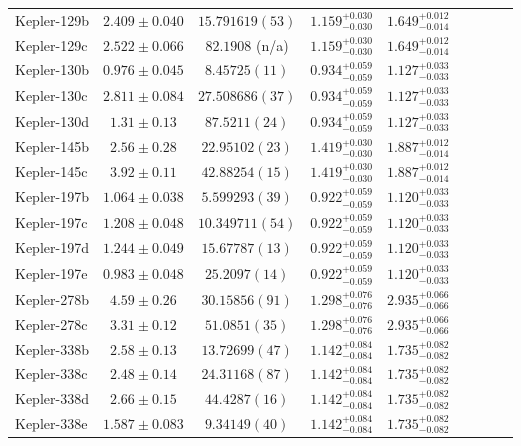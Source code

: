 \documentclass[a4paper,fleqn,usenatbib]{mnras}
\begin{document}
\begin{table*}
\begin{tabular}{lcccccccc}
Kepler-129b&	$2.409 \pm 0.040$	&$15.791619 (53)$	&$1.159_{-0.030}^{+0.030}$	&$1.649_{-0.014}^{+0.012}$		\\
Kepler-129c&	$2.522 \pm 0.066$	&$82.1908$ (n/a)	&$1.159_{-0.030}^{+0.030}$	&$1.649_{-0.014}^{+0.012}$		\\
Kepler-130b&	$0.976 \pm 0.045$	&$8.45725 (11)$		&$0.934_{-0.059}^{+0.059}$	&$1.127_{-0.033}^{+0.033}$	\\
Kepler-130c&	$2.811 \pm 0.084$	&$27.508686 (37)$	&$0.934_{-0.059}^{+0.059}$	&$1.127_{-0.033}^{+0.033}$	\\
Kepler-130d&	$1.31 \pm 0.13$    	&$87.5211 (24)$		&$0.934_{-0.059}^{+0.059}$	&$1.127_{-0.033}^{+0.033}$	\\
Kepler-145b&	$2.56 \pm 0.28$    	&$22.95102 (23)$	&$1.419_{-0.030}^{+0.030}$	&$1.887_{-0.014}^{+0.012}$		\\
Kepler-145c&	$3.92 \pm 0.11$    	&$42.88254 (15)$	&$1.419_{-0.030}^{+0.030}$	&$1.887_{-0.014}^{+0.012}$		\\
Kepler-197b&	$1.064 \pm 0.038$	&$5.599293 (39)$	&$0.922_{-0.059}^{+0.059}$	&$1.120_{-0.033}^{+0.033}$	\\
Kepler-197c&	$1.208 \pm 0.048$	&$10.349711 (54)$	&$0.922_{-0.059}^{+0.059}$	&$1.120_{-0.033}^{+0.033}$	\\
Kepler-197d&	$1.244 \pm 0.049$	&$15.67787 (13)$	&$0.922_{-0.059}^{+0.059}$	&$1.120_{-0.033}^{+0.033}$	\\
Kepler-197e&	$0.983 \pm 0.048$	&$25.2097 (14)$		&$0.922_{-0.059}^{+0.059}$	&$1.120_{-0.033}^{+0.033}$	\\
Kepler-278b&	$4.59 \pm 0.26$    	&$30.15856 (91)$	&$1.298_{-0.076}^{+0.076}$	&$2.935_{-0.066}^{+0.066}$	\\
Kepler-278c&	$3.31 \pm 0.12$    	&$51.0851 (35)$		&$1.298_{-0.076}^{+0.076}$	&$2.935_{-0.066}^{+0.066}$	\\
Kepler-338b&	$2.58 \pm 0.13$    	&$13.72699 (47)$	&$1.142_{-0.084}^{+0.084}$	&$1.735_{-0.082}^{+0.082}$	\\
Kepler-338c&	$2.48 \pm 0.14$    	&$24.31168 (87)$	&$1.142_{-0.084}^{+0.084}$	&$1.735_{-0.082}^{+0.082}$	\\
Kepler-338d&	$2.66 \pm 0.15$    	&$44.4287 (16)$		&$1.142_{-0.084}^{+0.084}$	&$1.735_{-0.082}^{+0.082}$	\\
Kepler-338e&	$1.587 \pm 0.083$	&$9.34149 (40)$		&$1.142_{-0.084}^{+0.084}$	&$1.735_{-0.082}^{+0.082}$	\\

\end{tabular}
\end{table*}
\end{document}

